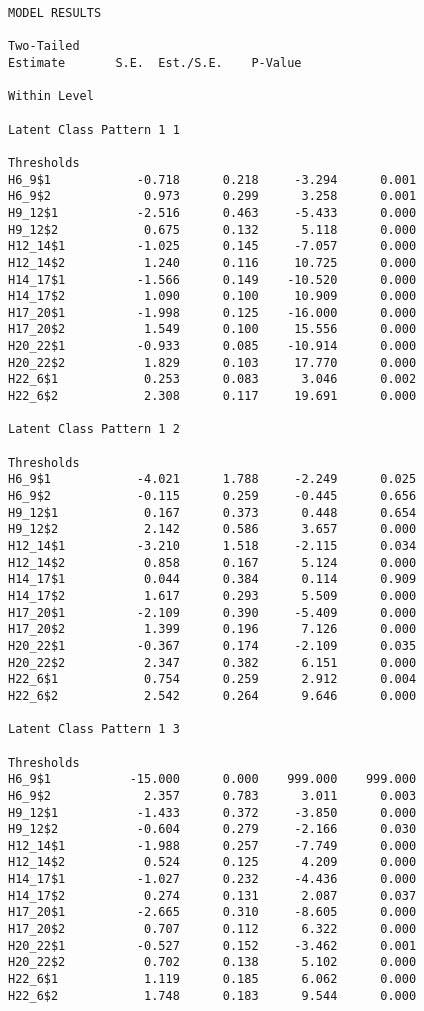 \begin{verbatim}
MODEL RESULTS

Two-Tailed
Estimate       S.E.  Est./S.E.    P-Value

Within Level

Latent Class Pattern 1 1

Thresholds
H6_9$1            -0.718      0.218     -3.294      0.001
H6_9$2             0.973      0.299      3.258      0.001
H9_12$1           -2.516      0.463     -5.433      0.000
H9_12$2            0.675      0.132      5.118      0.000
H12_14$1          -1.025      0.145     -7.057      0.000
H12_14$2           1.240      0.116     10.725      0.000
H14_17$1          -1.566      0.149    -10.520      0.000
H14_17$2           1.090      0.100     10.909      0.000
H17_20$1          -1.998      0.125    -16.000      0.000
H17_20$2           1.549      0.100     15.556      0.000
H20_22$1          -0.933      0.085    -10.914      0.000
H20_22$2           1.829      0.103     17.770      0.000
H22_6$1            0.253      0.083      3.046      0.002
H22_6$2            2.308      0.117     19.691      0.000

Latent Class Pattern 1 2

Thresholds
H6_9$1            -4.021      1.788     -2.249      0.025
H6_9$2            -0.115      0.259     -0.445      0.656
H9_12$1            0.167      0.373      0.448      0.654
H9_12$2            2.142      0.586      3.657      0.000
H12_14$1          -3.210      1.518     -2.115      0.034
H12_14$2           0.858      0.167      5.124      0.000
H14_17$1           0.044      0.384      0.114      0.909
H14_17$2           1.617      0.293      5.509      0.000
H17_20$1          -2.109      0.390     -5.409      0.000
H17_20$2           1.399      0.196      7.126      0.000
H20_22$1          -0.367      0.174     -2.109      0.035
H20_22$2           2.347      0.382      6.151      0.000
H22_6$1            0.754      0.259      2.912      0.004
H22_6$2            2.542      0.264      9.646      0.000

Latent Class Pattern 1 3

Thresholds
H6_9$1           -15.000      0.000    999.000    999.000
H6_9$2             2.357      0.783      3.011      0.003
H9_12$1           -1.433      0.372     -3.850      0.000
H9_12$2           -0.604      0.279     -2.166      0.030
H12_14$1          -1.988      0.257     -7.749      0.000
H12_14$2           0.524      0.125      4.209      0.000
H14_17$1          -1.027      0.232     -4.436      0.000
H14_17$2           0.274      0.131      2.087      0.037
H17_20$1          -2.665      0.310     -8.605      0.000
H17_20$2           0.707      0.112      6.322      0.000
H20_22$1          -0.527      0.152     -3.462      0.001
H20_22$2           0.702      0.138      5.102      0.000
H22_6$1            1.119      0.185      6.062      0.000
H22_6$2            1.748      0.183      9.544      0.000


\end{verbatim}
